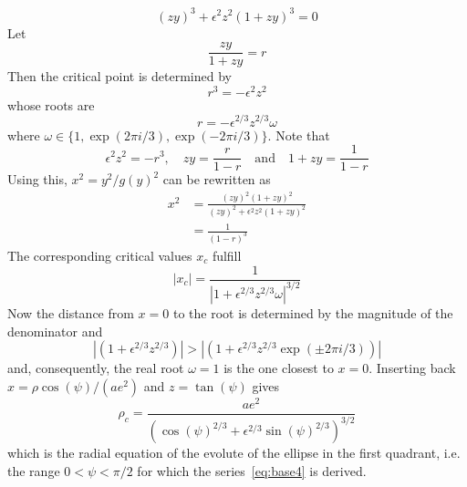 \documentclass[a4paper]{amsart}
\begin{document}
\begin{equation}\label{eq:y_c_req}
(zy)^3+\epsilon^2z^2(1+zy)^3=0
\end{equation}
Let
\begin{equation*}
\frac{zy}{1+zy}=r
\end{equation*}
Then the critical point is determined by
\begin{equation*}
r^3=-\epsilon^2z^2
\end{equation*}
whose roots are
\begin{equation*}
r=-\epsilon^{2/3}z^{2/3}\omega
\end{equation*}
where $\omega\in\{1, \exp(2\pi i/3), \exp(-2\pi i/3)\}$. Note that
\begin{equation*}
\epsilon^2z^2 = -r^3,\quad zy = \frac{r}{1-r}\quad\text{and}\quad 1+zy=\frac{1}{1-r}
\end{equation*}
Using this, $x^2=y^2/g(y)^2$ can be rewritten as
\begin{align*}
x^2 &= \frac{(zy)^2(1+zy)^2}{(zy)^2 + \epsilon^2z^2(1+zy)^2}\\
&=\frac{1}{(1-r)^3}
\end{align*}
The corresponding critical values $x_c$ fulfill
\begin{equation}\label{eq:x_bound}
|x_c| = \frac{1}{|1+\epsilon^{2/3}z^{2/3}\omega|^{3/2}}
\end{equation}
Now the distance from $x=0$ to the root is determined by the magnitude of the denominator and
\begin{equation*}
\left|(1+\epsilon^{2/3}z^{2/3})\right|> \left|(1+\epsilon^{2/3}z^{2/3}\exp(\pm2\pi i/3))\right|
\end{equation*}
and, consequently, the real root $\omega=1$ is the one closest to $x=0$. %
Inserting back $x=\rho\cos(\psi)/(ae^2)$ and $z=\tan(\psi)$ gives
\begin{equation}\label{eq:phi_bound_single_quadrant}
\rho_c =\frac{ae^2}
{\left(\cos(\psi)^{2/3}+\epsilon^{2/3}\sin(\psi)^{2/3}\right)^{3/2}}
\end{equation}
which is the radial equation of the evolute of the ellipse in the first quadrant, i.e. the range $0<\psi<\pi/2$ for which the series~\eqref{eq:base4} is derived. %
\end{document}
